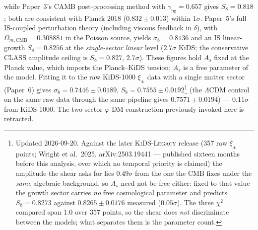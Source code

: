 while Paper~3's CAMB post-processing method with $\gamma_\mathrm{bg}=0.657$
gives $S_8=0.818$; both are consistent with Planck 2018 ($0.832\pm0.013$) within $1\sigma$.
Paper~5's full IS-coupled perturbation theory (including viscous feedback in $\delta$),
with $\Omega_{m,\mathrm{CMB}}=0.308881$ in the Poisson source,
yields $\sigma_8=0.8136$ and an IS linear-growth $S_8=0.8256$ at the
\emph{single-sector linear} level ($2.7\sigma$ KiDS; the conservative CLASS
amplitude ceiling is $S_8=0.827$, $2.7\sigma$).  These figures hold $A_s$ fixed at the Planck value, which imports the
Planck--KiDS tension; $A_s$ is a free parameter of the model. Fitting it to
the raw KiDS-1000 $\xi_\pm$ data with a single matter sector (Paper~6) gives
$\sigma_8=0.7446\pm0.0189$, $S_8=0.7555\pm0.0192$\footnote{Updated 2026-09-20. Against the later \textsc{KiDS-Legacy} release (357 raw $\xi_\pm$ points; Wright et al.\ 2025, arXiv:2503.19441 --- published sixteen months before this analysis, over which no temporal priority is claimed) the amplitude the shear asks for lies $0.49\sigma$ from the one the CMB fixes under the \emph{same} algebraic background, so $A_s$ need not be free either: fixed to that value the growth sector carries \emph{no} free cosmological parameter and predicts $S_8=0.8273$ against $0.8265\pm0.0176$ measured ($0.05\sigma$). The three $\chi^2$ compared span $1.0$ over 357 points, so the shear does \emph{not} discriminate between the models; what separates them is the parameter count.} (the $\Lambda$CDM control on the same raw data through the same pipeline gives $0.7571\pm0.0194$) --- $0.11\sigma$ from
KiDS-1000. The two-sector $\varphi$-DM construction previously invoked here is
retracted.

